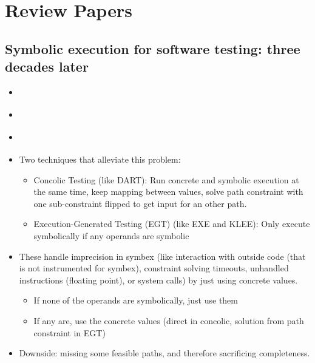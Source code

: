 \documentclass{article}
\begin{document}
\pagebreak
\section{Review Papers}
\subsection{Symbolic execution for software testing: three decades later}
\begin{itemize}
    \item \cite{ReviewThreeDecades}
    \item {}\cite{ReviewThreeDecades}
    \item {}\cite{ReviewThreeDecades}
    \item Two techniques that alleviate this problem:
          \begin{itemize}
              \item Concolic Testing (like DART\cite{DART}): Run concrete and symbolic execution at the same time, keep mapping between values, solve path constraint with one sub-constraint flipped to get input for an other path.
              \item Execution-Generated Testing (EGT) (like EXE\cite{EXE} and KLEE\cite{KLEE}): Only execute symbolically if any operands are symbolic
          \end{itemize}
    \item These handle imprecision in symbex (like interaction with outside code (that is not instrumented for symbex), constraint solving timeouts, unhandled instructions (floating point), or system calls) by just using concrete values.
          \begin{itemize}
              \item If none of the operands are symbolically, just use them
              \item If any are, use the concrete values (direct in concolic, solution from path constraint in EGT)
          \end{itemize}
    \item Downside: missing some feasible paths, and therefore sacrificing completeness.

\end{itemize}
\end{document}
